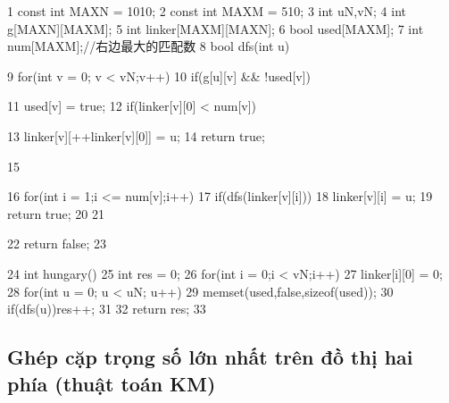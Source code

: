 \documentclass[11pt]{article}
\begin{document}
\begin{Code}
 1   const int MAXN = 1010;
 2   const int MAXM = 510;
 3   int uN,vN;
 4   int g[MAXN][MAXM];
 5   int linker[MAXM][MAXN];
 6   bool used[MAXM];
 7   int num[MAXM];//右边最大的匹配数
 8   bool dfs(int u){
 9       for(int v = 0; v < vN;v++)
10           if(g[u][v] && !used[v]){
11               used[v] = true;
12               if(linker[v][0] < num[v]){
13                    linker[v][++linker[v][0]] = u;
14                    return true;


15             }
16             for(int i = 1;i <= num[v];i++)
17                  if(dfs(linker[v][i])){
18                      linker[v][i] = u;
19                      return true;
20                  }
21         }
22     return false;
23 }
24 int hungary(){
25     int res = 0;
26     for(int i = 0;i < vN;i++)
27         linker[i][0] = 0;
28     for(int u = 0; u < uN; u++){
29         memset(used,false,sizeof(used));
30         if(dfs(u))res++;
31     }
32     return res;
33 }
\end{Code}

\subsection{Ghép cặp trọng số lớn nhất trên đồ thị hai phía (thuật toán KM)}
\end{document}
